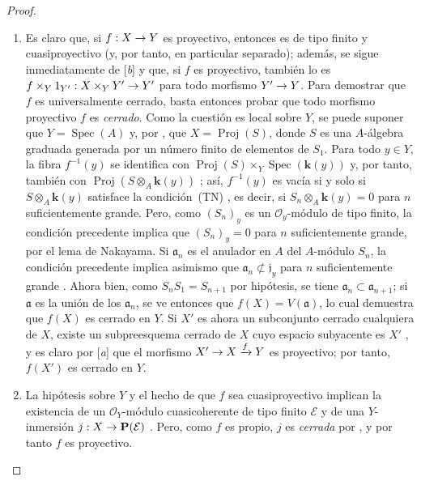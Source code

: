 \documentclass[oneside,10pt]{amsart}
\makeatletter
\newcommand{\ega@arrow}[2]{\mathchoice{#1}{#2}{#2}{#2}}
\renewcommand{\to}{\ega@arrow{\longrightarrow}{\rightarrow}}
\makeatother
\begin{document}
\begin{proof}
\medskip\noindent
\begin{enumerate}
  \item[(i)] Es claro que, si $f:X\to Y$ es proyectivo, entonces es de tipo finito y cuasiproyectivo (y, por tanto, en particular separado); además, se sigue inmediatamente de [\emph{b}] y  que, si $f$ es proyectivo, también lo es $f\times_Y1_{Y'}:X\times_YY'\to Y'$ para todo morfismo $Y'\to Y$.
    Para demostrar que $f$ es universalmente cerrado, basta entonces probar que todo morfismo proyectivo $f$ es \emph{cerrado}.
    Como la cuestión es local sobre $Y$, se puede suponer que $Y=\operatorname{Spec}(A)$ y, por , que $X=\operatorname{Proj}(S)$, donde $S$ es una $A$-álgebra graduada generada por un número finito de elementos de $S_1$.
    Para todo $y\in Y$, la fibra $f^{-1}(y)$ se identifica con $\operatorname{Proj}(S)\times_Y\operatorname{Spec}(\boldsymbol{k}(y))$  y, por tanto, también con $\operatorname{Proj}(S\otimes_A\boldsymbol{k}(y))$ ;
    así, $f^{-1}(y)$ es vacía si y solo si $S\otimes_A\boldsymbol{k}(y)$ satisface la condición~(TN) , es decir, si $S_n\otimes_A\boldsymbol{k}(y)=0$ para $n$ suficientemente grande.
    Pero, como $(S_n)_y$ es un $\mathcal{O}_y$-módulo de tipo finito, la condición precedente implica que $(S_n)_y=0$ para $n$ suficientemente grande, por el lema de Nakayama.
    Si $\mathfrak a_n$ es el anulador en $A$ del $A$-módulo $S_n$, la condición precedente implica asimismo que $\mathfrak a_n\not\subset\mathfrak j_y$ para $n$ suficientemente grande .
    Ahora bien, como $S_nS_1=S_{n+1}$ por hipótesis, se tiene $\mathfrak a_n\subset\mathfrak a_{n+1}$; si $\mathfrak a$ es la unión de los $\mathfrak a_n$, se ve entonces que $f(X)=V(\mathfrak a)$, lo cual demuestra que $f(X)$ es cerrado en $Y$.
    Si $X'$ es ahora un subconjunto cerrado cualquiera de $X$, existe un subpreesquema cerrado de $X$ cuyo espacio subyacente es $X'$ , y es claro por [\emph{a}] que el morfismo $X'\to X\xrightarrow{f}Y$ es proyectivo; por tanto, $f(X')$ es cerrado en $Y$.
  \item[(ii)] La hipótesis sobre $Y$ y el hecho de que $f$ sea cuasiproyectivo implican la existencia de un $\mathcal{O}_Y$-módulo cuasicoherente de tipo finito $\mathcal{E}$ y de una $Y$-inmersión $j:X\to\mathbf{P}(\mathcal{E})$ .
    Pero, como $f$ es propio, $j$ es \emph{cerrada} por , y por tanto $f$ es proyectivo.
\end{enumerate}
\end{proof}
\end{document}
